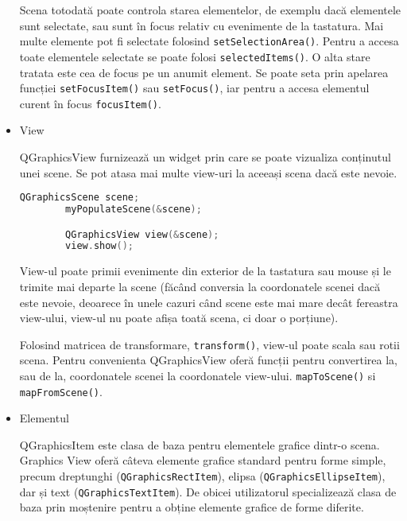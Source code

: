 \begin{itemize}
    Scena totodată poate controla starea elementelor, de exemplu dacă elementele sunt selectate, sau sunt în focus relativ cu 
    evenimente de la tastatura. Mai multe elemente pot fi selectate folosind \verb|setSelectionArea()|. 
    Pentru a accesa toate elementele selectate se poate folosi \verb|selectedItems()|. O alta stare tratata este cea 
    de focus pe un anumit element. Se poate seta prin apelarea funcției \verb|setFocusItem()| sau \verb|setFocus()|, 
    iar pentru a accesa elementul curent în focus \verb|focusItem()|.\newline

    \item View
    
    QGraphicsView furnizează un widget prin care se poate vizualiza conținutul unei scene. Se pot atasa mai multe view-uri la 
    aceeași scena dacă este nevoie. 

    \begin{lstlisting}[language=C++]
        QGraphicsScene scene;
        myPopulateScene(&scene);

        QGraphicsView view(&scene);
        view.show();

    \end{lstlisting}

    View-ul poate primii evenimente din exterior de la tastatura sau mouse și le trimite mai departe la scene 
    (făcând conversia la coordonatele scenei dacă este nevoie, deoarece în unele cazuri când scene este mai mare 
    decât fereastra view-ului, view-ul nu poate afișa toată scena, ci doar o porțiune).\newline
    
    Folosind matricea de transformare, \verb|transform()|, view-ul poate scala sau rotii scena. 
    Pentru convenienta QGraphicsView oferă funcții pentru convertirea la, sau de la, coordonatele scenei la 
    coordonatele view-ului. \verb|mapToScene()| si \verb|mapFromScene()|.\newline

    \item Elementul
    
    QGraphicsItem este clasa de baza pentru elementele grafice dintr-o scena. Graphics View oferă câteva elemente grafice 
    standard pentru forme simple, precum dreptunghi  (\verb|QGraphicsRectItem|), elipsa (\verb|QGraphicsEllipseItem|), dar și text 
    (\verb|QGraphicsTextItem|). De obicei utilizatorul specializează clasa de baza prin moștenire pentru a obține elemente 
    grafice de forme diferite.\newline


\end{itemize}
